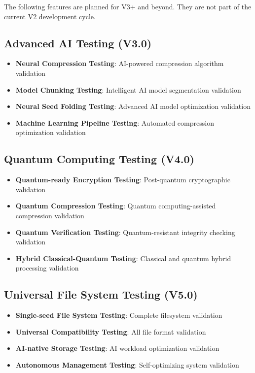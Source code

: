 \documentclass[12pt,a4paper]{article}
\begin{document}
\begin{tcolorbox}[colback=v3green!10,colframe=v3green!50,title=\textbf{Not Yet in V2 - Future Roadmap}]
The following features are planned for V3+ and beyond. They are not part of the current V2 development cycle.
\end{tcolorbox}

\subsection{Advanced AI Testing (V3.0)}
\begin{itemize}
    \item \textbf{Neural Compression Testing}: AI-powered compression algorithm validation
    \item \textbf{Model Chunking Testing}: Intelligent AI model segmentation validation
    \item \textbf{Neural Seed Folding Testing}: Advanced AI model optimization validation
    \item \textbf{Machine Learning Pipeline Testing}: Automated compression optimization validation
\end{itemize}

\subsection{Quantum Computing Testing (V4.0)}
\begin{itemize}
    \item \textbf{Quantum-ready Encryption Testing}: Post-quantum cryptographic validation
    \item \textbf{Quantum Compression Testing}: Quantum computing-assisted compression validation
    \item \textbf{Quantum Verification Testing}: Quantum-resistant integrity checking validation
    \item \textbf{Hybrid Classical-Quantum Testing}: Classical and quantum hybrid processing validation
\end{itemize}

\subsection{Universal File System Testing (V5.0)}
\begin{itemize}
    \item \textbf{Single-seed File System Testing}: Complete filesystem validation
    \item \textbf{Universal Compatibility Testing}: All file format validation
    \item \textbf{AI-native Storage Testing}: AI workload optimization validation
    \item \textbf{Autonomous Management Testing}: Self-optimizing system validation
\end{itemize}
\end{document}
